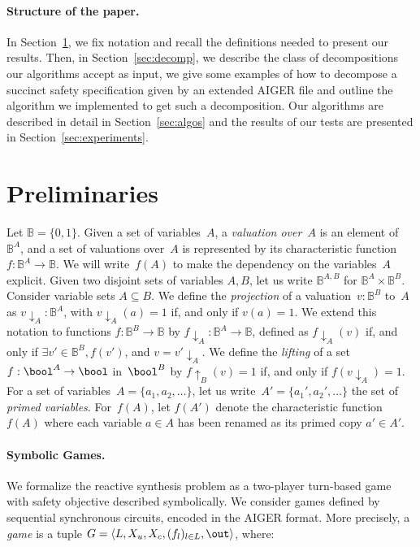\documentclass[submission,copyright,creativecommons]{eptcs}
\begin{document}
\paragraph{Structure of the paper.}
In Section~\ref{sec:prelim}, we fix notation and recall the definitions needed to
present our results. Then, in Section~\ref{sec:decomp}, we describe the class of
decompositions our algorithms accept as input, we give some examples of how to
decompose a succinct safety specification given by an extended AIGER file and
outline the algorithm we implemented to get such a decomposition. Our algorithms
are described in detail in Section~\ref{sec:algos} and the results of our tests
are presented in Section~\ref{sec:experiments}.
      
\section{Preliminaries}\label{sec:prelim}
Let $\mathbb{B} = \{0,1\}$. Given a set of variables~$A$, 
a \emph{valuation over~$A$} is an element of~$\mathbb{B}^A$,
and a set of valuations over~$A$ is represented by its characteristic function
$f : \mathbb{B}^A \rightarrow \mathbb{B}$. We will write~$f(A)$
to make the dependency on the variables~$A$ explicit.
Given two disjoint sets of variables $A,B$, let us write
$\mathbb{B}^{A,B}$ for $\mathbb{B}^A \times \mathbb{B}^B$.
Consider variable sets $A\subseteq B$.
We define the \emph{projection} of a valuation~$v : \mathbb{B}^B$
to~$A$ as $v\downarrow_A : \mathbb{B}^A$, with $v\downarrow_A(a) =1$
if, and only if $v(a) = 1$.
We extend this notation to 
functions $f : \mathbb{B}^B \rightarrow \mathbb{B}$ by
$f \downarrow_A : \mathbb{B}^A \rightarrow \mathbb{B}$, 
defined as $f\downarrow_A(v)$ if, and only if $\exists v' \in \mathbb{B}^B,
f(v')$, and $v = v' \downarrow_A$.
We define the \emph{lifting} of a set~$f: \bool^A \rightarrow \bool$
in~$\bool^B$ by $f\uparrow_B(v) = 1$ if, and only if $f(v\downarrow_A) =1$.
For a set of variables~$A=\{a_1,a_2,\ldots\}$, let us
write~$A'=\{a_1',a_2',\ldots\}$ the set of \emph{primed variables}.  For~$f(A)$,
let $f(A')$ denote the characteristic function $f(A)$ where each variable $a \in
A$ has been renamed as its primed copy $a' \in A'$.

\paragraph{Symbolic Games.}
We formalize the reactive synthesis problem as a two-player turn-based game
with safety objective described symbolically. We consider games
defined by sequential synchronous circuits, encoded in the AIGER format.
More precisely, a \emph{game} is a tuple $G = \langle L, X_u, X_c, (f_l)_{l\in
L}, \out\rangle$, where:
\end{document}
